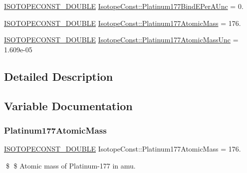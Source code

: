 \begin{DoxyCompactItemize}
\mbox{\hyperlink{group___isotope_const-_macros_ga8f45a7272ce02c0b4c65c44636ed719a}{I\+S\+O\+T\+O\+P\+E\+C\+O\+N\+S\+T\+\_\+\+D\+O\+U\+B\+LE}} \mbox{\hyperlink{group___isotope_const-_platinum-_pt177_ga3b35f647f13ee8f0c359350e2fd8d80b}{Isotope\+Const\+::\+Platinum177\+Bind\+E\+Per\+A\+Unc}} = 0.
\item 
\mbox{\hyperlink{group___isotope_const-_macros_ga8f45a7272ce02c0b4c65c44636ed719a}{I\+S\+O\+T\+O\+P\+E\+C\+O\+N\+S\+T\+\_\+\+D\+O\+U\+B\+LE}} \mbox{\hyperlink{group___isotope_const-_platinum-_pt177_ga581c31b2cbf6f4f77b1c9751b904947b}{Isotope\+Const\+::\+Platinum177\+Atomic\+Mass}} = 176.
\item 
\mbox{\hyperlink{group___isotope_const-_macros_ga8f45a7272ce02c0b4c65c44636ed719a}{I\+S\+O\+T\+O\+P\+E\+C\+O\+N\+S\+T\+\_\+\+D\+O\+U\+B\+LE}} \mbox{\hyperlink{group___isotope_const-_platinum-_pt177_ga19474eb5b63c893c6c8f6a7248d703ba}{Isotope\+Const\+::\+Platinum177\+Atomic\+Mass\+Unc}} = 1.\+609e-\/05
\end{DoxyCompactItemize}


\subsection{Detailed Description}


\subsection{Variable Documentation}
\mbox{\label{group___isotope_const-_platinum-_pt177_ga581c31b2cbf6f4f77b1c9751b904947b}} 
\subsubsection{\texorpdfstring{Platinum177\+Atomic\+Mass}{Platinum177AtomicMass}}
{\footnotesize\ttfamily \mbox{\hyperlink{group___isotope_const-_macros_ga8f45a7272ce02c0b4c65c44636ed719a}{I\+S\+O\+T\+O\+P\+E\+C\+O\+N\+S\+T\+\_\+\+D\+O\+U\+B\+LE}} Isotope\+Const\+::\+Platinum177\+Atomic\+Mass = 176.}

\$ \$ Atomic mass of Platinum-\/177 in amu. \mbox{\label{group___isotope_const-_platinum-_pt177_ga19474eb5b63c893c6c8f6a7248d703ba}} 
